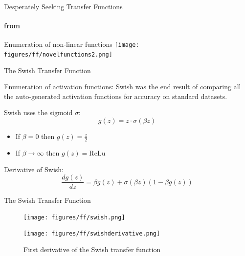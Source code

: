 \begin{frame}{Desperately Seeking Transfer Functions}
\framesubtitle{from \cite{Ramachandran2017}}
\begin{block}{Enumeration of non-linear functions}
\centering
\texttt{[image: figures/ff/novelfunctions2.png]}
\end{block}
\end{frame}

\begin{frame}{The Swish Transfer Function \cite{Ramachandran2017}}

\begin{block}{Enumeration of activation functions:}
Swish was the end result of comparing all the auto-generated activation functions for accuracy on standard datasets.
\end{block}

\begin{block}{Swish uses the sigmoid $\sigma$:}
\[ g(z) = z \cdot \sigma(\beta z) \]
\begin{itemize}[<+->]
	\item If $\beta = 0$ then $g(z) = \frac{z}{2}$ 
	\item If $\beta \rightarrow \infty$ then $g(z) = \textrm{ReLu}$
\end{itemize}
\end{block}

\pause
\begin{block}{Derivative of Swish:}
\[ \frac{d g(z)}{dz} = \beta g(z) + \sigma(\beta z)(1 - \beta g(z)) \]
\end{block}
\end{frame}


\begin{frame}{The Swish Transfer Function \cite{Ramachandran2017}}
    \begin{figure}[ht]
        \begin{minipage}[b]{0.45\linewidth}
            \centering
            \texttt{[image: figures/ff/swish.png]}
            \caption{Swish transfer function with different values of $\beta$}
        \end{minipage}
        \hspace{0.2cm}
        \begin{minipage}[b]{0.45\linewidth}
            \centering
            \texttt{[image: figures/ff/swishderivative.png]}
            \caption{First derivative of the Swish transfer function}
        \end{minipage}
    \end{figure}
\end{frame}

